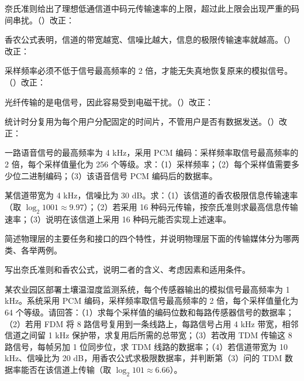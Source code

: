 \documentclass[a4paper,11pt]{article}
\begin{document}
\q 奈氏准则给出了理想低通信道中码元传输速率的上限，超过此上限会出现严重的码间串扰。\quad（\quad）\quad 改正：\fixblank

\q 香农公式表明，信道的带宽越宽、信噪比越大，信息的极限传输速率就越高。\quad（\quad）\quad 改正：\fixblank

\q 采样频率必须不低于信号最高频率的 2 倍，才能无失真地恢复原来的模拟信号。\quad（\quad）\quad 改正：\fixblank

\q 光纤传输的是电信号，因此容易受到电磁干扰。\quad（\quad）\quad 改正：\fixblank

\q 统计时分复用为每个用户分配固定的时间片，不管用户是否有数据发送。\quad（\quad）\quad 改正：\fixblank

\q 一路语音信号的最高频率为 4 kHz，采用 PCM 编码：采样频率取信号最高频率的 2 倍，每个采样值量化为 256 个等级。求：（1）采样频率；（2）每个采样值需要多少位二进制编码；（3）该语音信号 PCM 编码后的数据率。

\q 某信道带宽为 4 kHz，信噪比为 30 dB。求：（1）该信道的香农极限信息传输速率（取 $\log_2 1001\approx 9.97$）；（2）若采用 16 种码元传输，按奈氏准则求最高信息传输速率；（3）说明在该信道上采用 16 种码元能否实现上述速率。

\q 简述物理层的主要任务和接口的四个特性，并说明物理层下面的传输媒体分为哪两类、各举两例。\anslines{2.4cm}

\q 写出奈氏准则和香农公式，说明二者的含义、考虑因素和适用条件。\anslines{2.4cm}

\newpage
{}
\q 某农业园区部署土壤温湿度监测系统，每个传感器输出的模拟信号最高频率为 1 kHz。系统采用 PCM 编码，采样频率取信号最高频率的 2 倍，每个采样值量化为 64 个等级。请回答：（1）求每个采样值的编码位数和每路传感器信号的数据率；（2）若用 FDM 将 8 路信号复用到一条线路上，每路信号占用 4 kHz 带宽，相邻信道之间留 1 kHz 保护带，求复用后所需的总带宽；（3）若改用 TDM 传输这 8 路信号，每帧另加 1 位同步位，求 TDM 线路的数据率；（4）若信道带宽为 10 kHz、信噪比为 20 dB，用香农公式求极限数据率，并判断第（3）问的 TDM 数据率能否在该信道上传输（取 $\log_2 101\approx 6.66$）。\anslines{5cm}
\end{document}
